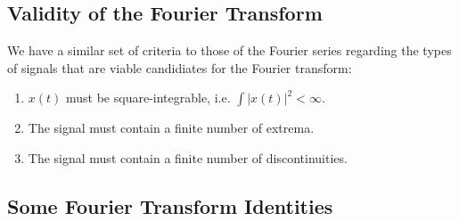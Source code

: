 \subsection{Validity of the Fourier Transform}
%
We have a similar set of criteria to those of the Fourier series regarding
the types of signals that are viable candidiates for the Fourier transform:
%
\begin{enumerate}
\item $x(t)$ must be square-integrable, i.e. $\int|x(t)|^2 < \infty$.
\item The signal must contain a finite number of extrema.
\item The signal must contain a finite number of discontinuities.
\end{enumerate}

\subsection{Some Fourier Transform Identities}
%
